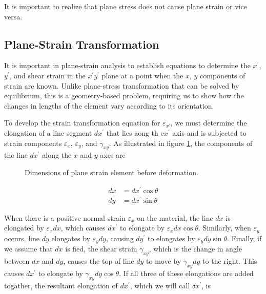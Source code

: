 \documentclass[
fontsize=10pt,
a4paper,
twosides=false,
open=any,
svgnames,
]{kaobook} %
\begin{document}
It is important to realize that plane stress does not cause plane strain or vice versa.

\subsection{Plane-Strain Transformation}

It is important in plane-strain analysis to establish equations to determine the $x^\prime $, $y^\prime$, and shear strain in the $x^\prime y^\prime$ plane at a point when the $x$, $y$ components of strain are known. Unlike plane-stress transformation that can be solved by equilibrium, this is a geometry-based problem, requiring us to show how the changes in lengths of the element vary according to its orientation.

To develop the strain transformation equation for $\varepsilon_{x^\prime }$, we must determine the elongation of a line segment $dx^\prime $ that lies aong th e$x^\prime $ axis and is subjected to strain components $\varepsilon_x$, $\varepsilon_y$, and $\gamma_{xy}$. As illustrated in figure \cref{fig: plane strain before deformation}, the components of the line $dx^\prime $ along the $x$ and $y$ axes are

\begin{figure}[h]
  \centering
  \caption{Dimensions of plane strain element before deformation.}
  \label{fig: plane strain before deformation}
\end{figure}

\begin{align*}
  dx &= dx^\prime  \cos \theta \\
  dy &= dx^\prime  \sin \theta
\end{align*}

When there is a positive normal strain $\varepsilon_x$ on the material, the line $dx$ is elongated by $\varepsilon_x dx$, which causes $dx^\prime $ to elongate by $\varepsilon_x dx \cos \theta$. Similarly, when $\varepsilon_y$ occurs, line $dy$ elongates by $\varepsilon_y dy$, causing $dy^\prime$ to elongates by $\varepsilon_y dy \sin \theta$. Finally, if we assume that $dx$ is fied, the shear strain $\gamma_{xy}$, which is the change in angle between $dx$ and $dy$, causes the top of line $dy$ to move by $\gamma_{xy} dy$ to the right. This causes $dx^\prime $ to elongate by $\gamma_{xy} dy \cos \theta$. If all three of these elongations are added togather, the resultant elongation of $dx^\prime $, which we will call $\delta x^\prime $, is
\end{document}
